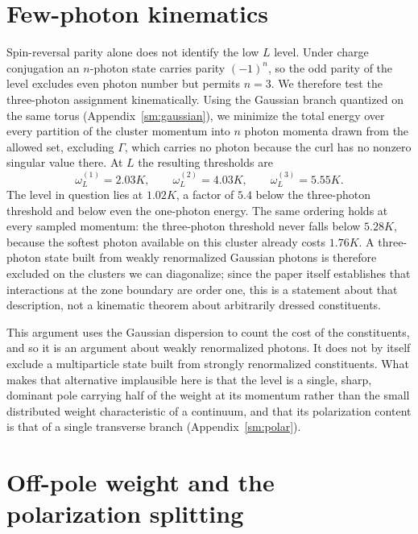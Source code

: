 \documentclass[aps,prl,twocolumn,amsmath,amssymb,superscriptaddress,
longbibliography,floatfix]{revtex4-2}
\begin{document}
\section{Few-photon kinematics}
\label{sm:kin}


Spin-reversal parity alone does not identify the low $L$ level. Under
charge conjugation an $n$-photon state carries parity $(-1)^n$, so the
odd parity of the level excludes even photon number but permits $n=3$.
We therefore test the three-photon assignment kinematically. Using the
Gaussian branch quantized on the same torus
(Appendix~\ref{sm:gaussian}), we minimize the total energy over every
partition of the cluster momentum into $n$ photon momenta drawn from
the allowed set, excluding $\Gamma$, which carries no photon because
the curl has no nonzero singular value there. At $L$ the resulting
thresholds are
\begin{equation}
 \omega^{(1)}_L=2.03K,\qquad
 \omega^{(2)}_L=4.03K,\qquad
 \omega^{(3)}_L=5.55K .
 \label{eq:thresholds}
\end{equation}
The level in question lies at $1.02K$, a factor of $5.4$ below the
three-photon threshold and below even the one-photon energy. The same
ordering holds at every sampled momentum: the three-photon threshold
never falls below $5.28K$, because the softest photon available on this
cluster already costs $1.76K$. A three-photon state built from weakly renormalized Gaussian
photons is therefore excluded on the clusters we can diagonalize;
since the paper itself establishes that interactions at the zone
boundary are order one, this is a statement about that description,
not a kinematic theorem about arbitrarily dressed constituents.

This argument uses the Gaussian dispersion to count the cost of the
constituents, and so it is an argument about weakly renormalized
photons. It does not by itself exclude a multiparticle state built
from strongly renormalized constituents. What makes that alternative
implausible here is that the level is a single, sharp, dominant pole
carrying half of the weight at its momentum rather than the small
distributed weight characteristic of a continuum, and that its
polarization content is that of a single transverse branch
(Appendix~\ref{sm:polar}).


\section{Off-pole weight and the polarization splitting}
\label{sm:offpole}
\end{document}

